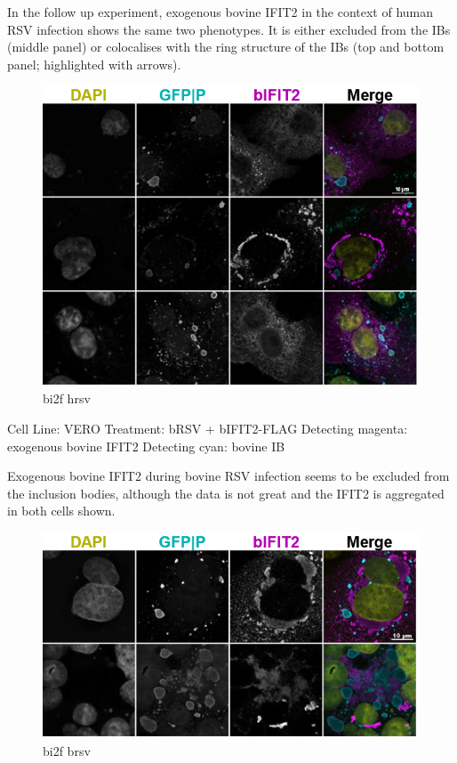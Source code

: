 In the follow up experiment, exogenous bovine IFIT2 in the context of human RSV infection shows the same two phenotypes. It is either excluded from the IBs (middle panel) or colocalises with the ring structure of the IBs (top and bottom panel; highlighted with arrows).

\begin{figure}
    \centering
    \includegraphics[width=1\linewidth]{09. Chapter 4//Figs//03. IFIT2-FLAG/05. bi2f hrsv.png}
    \caption[bi2f hrsv]{bi2f hrsv}
    \label{bi2f hrsv}
\end{figure}

Cell Line: VERO \newline
Treatment: bRSV + bIFIT2-FLAG \newline
Detecting magenta: exogenous bovine IFIT2 \newline
Detecting cyan: bovine IB \newline

Exogenous bovine IFIT2 during bovine RSV infection seems to be excluded from the inclusion bodies, although the data is not great and the IFIT2 is aggregated in both cells shown.

\begin{figure}
    \centering
    \includegraphics[width=1\linewidth]{09. Chapter 4//Figs//03. IFIT2-FLAG/06. bi2f brsv.png}
    \caption[bi2f brsv]{bi2f brsv}
    \label{bi2f brsv}
\end{figure}

